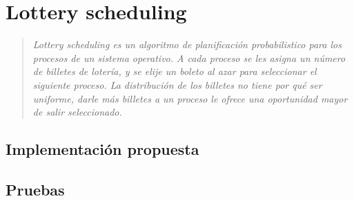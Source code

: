 \section{Lottery scheduling}
	\begin{quote}
		\textit{Lottery scheduling es un algoritmo de planificaci\'on probabilistico para los procesos de un sistema operativo. A cada proceso se les asigna un n\'umero de billetes de loter\'ia, y se elije un boleto al azar para seleccionar el siguiente proceso. La distribución de los billetes no tiene por qu\'e ser uniforme, darle más billetes a un proceso le ofrece una oportunidad mayor de salir seleccionado.}
	\end{quote}
\subsection{Implementaci\'on propuesta}
\subsection{Pruebas}